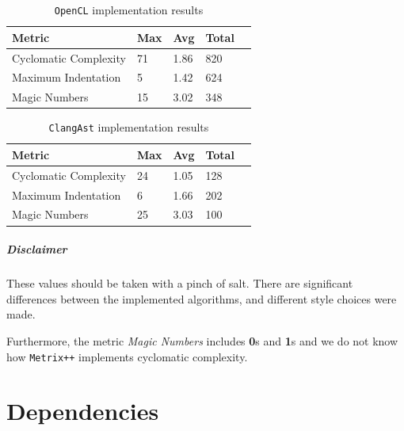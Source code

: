 \begin{table}[H]
    \centering
    \begin{tabular}{@{}lllll@{}}
        \toprule
        \textbf{Metric}       & \textbf{Max} & \textbf{Avg} & \textbf{Total} \\ \midrule
        Cyclomatic Complexity & 71           & 1.86         & 820           \\
        Maximum Indentation   & 5            & 1.42         & 624            \\
        Magic Numbers         & 15           & 3.02         & 348           \\ \bottomrule
    \end{tabular}
    \caption{\label{table:opencl-metrics}\texttt{OpenCL} implementation results}
\end{table}

\begin{table}[H]
    \centering
    \begin{tabular}{@{}lllll@{}}
        \toprule
        \textbf{Metric}       & \textbf{Max} & \textbf{Avg} & \textbf{Total} \\ \midrule
        Cyclomatic Complexity & 24           & 1.05         & 128            \\
        Maximum Indentation   & 6            & 1.66         & 202           \\
        Magic Numbers         & 25           & 3.03         & 100           \\ \bottomrule
    \end{tabular}
    \caption{\label{table:clangast-metrics}\texttt{ClangAst} implementation results}
\end{table}

\paragraph{Disclaimer} These values should be taken with a pinch of salt. There are significant differences between the implemented algorithms, and different style choices were made.

Furthermore, the metric \emph{Magic Numbers} includes \textbf{0}s and \textbf{1}s and we do not know how \texttt{Metrix++} implements cyclomatic complexity.

\chapter{Dependencies}

